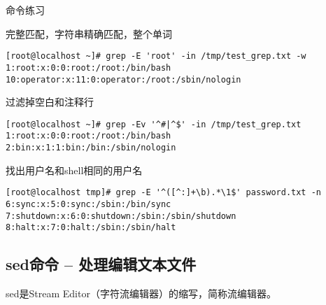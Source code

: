 \begin{ascolorbox10}{命令练习}
\begin{ascboxJ}{完整匹配，字符串精确匹配，整个单词}
\begin{lstlisting}[style=linux]
[root@localhost ~]# grep -E 'root' -in /tmp/test_grep.txt -w
1:root:x:0:0:root:/root:/bin/bash
10:operator:x:11:0:operator:/root:/sbin/nologin
	\end{lstlisting}
\end{ascboxJ}
	\begin{ascboxJ}{过滤掉空白和注释行}
	\begin{lstlisting}[style=linux]
[root@localhost ~]# grep -Ev '^#|^$' -in /tmp/test_grep.txt
1:root:x:0:0:root:/root:/bin/bash
2:bin:x:1:1:bin:/bin:/sbin/nologin
	\end{lstlisting}
\end{ascboxJ}
	\begin{ascboxJ}{找出用户名和shell相同的用户名}
	\begin{lstlisting}[style=linux]
[root@localhost tmp]# grep -E '^([^:]+\b).*\1$' password.txt -n
6:sync:x:5:0:sync:/sbin:/bin/sync
7:shutdown:x:6:0:shutdown:/sbin:/sbin/shutdown
8:halt:x:7:0:halt:/sbin:/sbin/halt
	\end{lstlisting}
\end{ascboxJ}
\end{ascolorbox10}


\subsection{sed命令 – 处理编辑文本文件}
sed是Stream Editor（字符流编辑器）的缩写，简称流编辑器。

